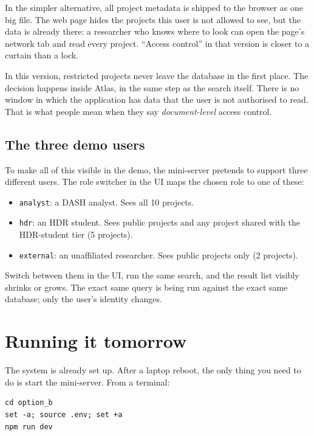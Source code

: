 \documentclass[11pt,a4paper]{article}
\begin{document}
In the simpler alternative, all project metadata is shipped to the browser as one big file. The web page hides the projects this user is not allowed to see, but the data is already there: a researcher who knows where to look can open the page's network tab and read every project. ``Access control'' in that version is closer to a curtain than a lock.

In this version, restricted projects never leave the database in the first place. The decision happens inside Atlas, in the same step as the search itself. There is no window in which the application has data that the user is not authorised to read. That is what people mean when they say \emph{document-level} access control.

\subsection{The three demo users}

To make all of this visible in the demo, the mini-server pretends to support three different users. The role switcher in the UI maps the chosen role to one of these:

\begin{itemize}[leftmargin=2em,itemsep=2pt]
  \item \texttt{analyst}: a DASH analyst. Sees all 10 projects.
  \item \texttt{hdr}: an HDR student. Sees public projects and any project shared with the HDR-student tier (5 projects).
  \item \texttt{external}: an unaffiliated researcher. Sees public projects only (2 projects).
\end{itemize}

Switch between them in the UI, run the same search, and the result list visibly shrinks or grows. The exact same query is being run against the exact same database; only the user's identity changes.

\section{Running it tomorrow}

The system is already set up. After a laptop reboot, the only thing you need to do is start the mini-server. From a terminal:

\begin{lstlisting}
cd option_b
set -a; source .env; set +a
npm run dev
\end{lstlisting}
\end{document}
